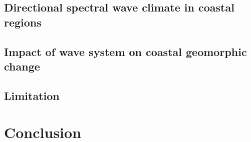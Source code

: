 \subsection{Directional spectral wave climate in coastal regions}
\label{Directional spectral wave climate in coastal regions}

\subsection{Impact of wave system on coastal geomorphic change}
\label{Impact of wave system on coastal geomorphic change}

\subsection{Limitation}
\label{Limitation}

\section{Conclusion}
\label{c4_Conclusion}